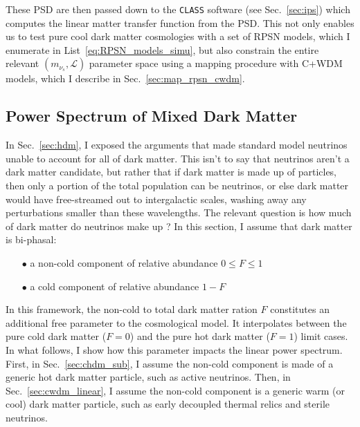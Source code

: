 These PSD are then passed down to the \texttt{CLASS} software (see Sec.~\ref{sec:ips}) which computes the linear matter transfer function from the PSD. This not only enables us to test pure cool dark matter cosmologies with a set of RPSN models, which I enumerate in List~\ref{eq:RPSN_models_simu}, but also constrain the entire relevant $\left( m_{\nu_s}, \mathcal{L} \right)$ parameter space using a mapping procedure with C+WDM models, which I describe in Sec.~\ref{sec:map_rpsn_cwdm}.


\subsection{Power Spectrum of Mixed Dark Matter}
\label{sec:mdmps}

In Sec.~\ref{sec:hdm}, I exposed the arguments that made standard model neutrinos unable to account for all of dark matter. This isn't to say that neutrinos aren't a dark matter candidate, but rather that if dark matter is made up of particles, then only a portion of the total population can be neutrinos, or else dark matter would have free-streamed out to intergalactic scales, washing away any perturbations smaller than these wavelengths. The relevant question is how much of dark matter do neutrinos make up ? In this section, I assume that dark matter is bi-phasal: \\

\begin{itemize}

\item[$\bullet$] a non-cold component of relative abundance $0 \leqslant F \leqslant 1$ \\

\item[$\bullet$] a cold component of relative abundance $1 - F$ \\

\end{itemize}

In this framework, the non-cold to total dark matter ration $F$ constitutes an additional free parameter to the cosmological model. It interpolates between the pure cold dark matter ($F = 0$) and the pure hot dark matter ($F = 1$) limit cases. In what follows, I show how this parameter impacts the linear power spectrum. First, in Sec.~\ref{sec:chdm_sub}, I assume the non-cold component is made of a generic hot dark matter particle, such as active neutrinos. Then, in Sec.~\ref{sec:cwdm_linear}, I assume the non-cold component is a generic warm (or cool) dark matter particle, such as early decoupled thermal relics and sterile neutrinos. 

